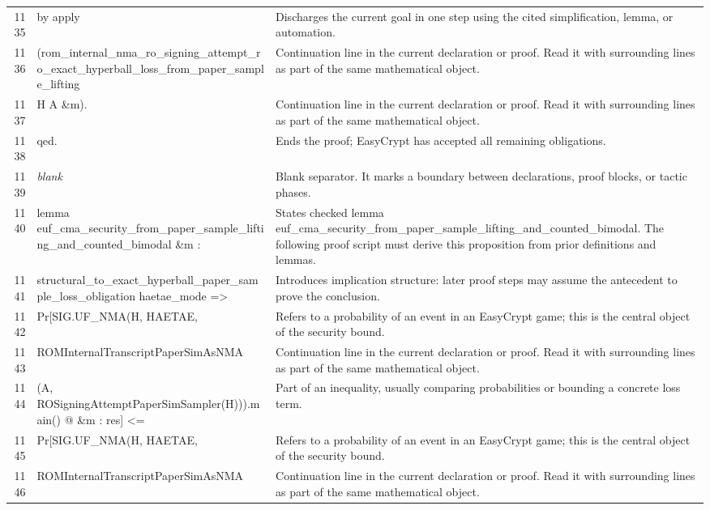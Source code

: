 \documentclass[10pt]{article}
\begin{document}
\begin{longtable}{r L{0.53\textwidth} L{0.37\textwidth}}
1135 & {\ttfamily\scriptsize by apply} & Discharges the current goal in one step using the cited simplification, lemma, or automation. \\
1136 & {\ttfamily\scriptsize   (rom\_internal\_nma\_ro\_signing\_attempt\_ro\_exact\_hyperball\_loss\_from\_paper\_sample\_lifting} & Continuation line in the current declaration or proof.  Read it with surrounding lines as part of the same mathematical object. \\
1137 & {\ttfamily\scriptsize      H A \&m).} & Continuation line in the current declaration or proof.  Read it with surrounding lines as part of the same mathematical object. \\
1138 & {\ttfamily\scriptsize qed.} & Ends the proof; EasyCrypt has accepted all remaining obligations. \\
1139 & {\ttfamily\scriptsize \emph{blank}} & Blank separator.  It marks a boundary between declarations, proof blocks, or tactic phases. \\
1140 & {\ttfamily\scriptsize lemma euf\_cma\_security\_from\_paper\_sample\_lifting\_and\_counted\_bimodal \&m :} & States checked lemma euf\_cma\_security\_from\_paper\_sample\_lifting\_and\_counted\_bimodal.  The following proof script must derive this proposition from prior definitions and lemmas. \\
1141 & {\ttfamily\scriptsize   structural\_to\_exact\_hyperball\_paper\_sample\_loss\_obligation haetae\_mode =>} & Introduces implication structure: later proof steps may assume the antecedent to prove the conclusion. \\
1142 & {\ttfamily\scriptsize   Pr[SIG.UF\_NMA(H, HAETAE,} & Refers to a probability of an event in an EasyCrypt game; this is the central object of the security bound. \\
1143 & {\ttfamily\scriptsize        ROMInternalTranscriptPaperSimAsNMA} & Continuation line in the current declaration or proof.  Read it with surrounding lines as part of the same mathematical object. \\
1144 & {\ttfamily\scriptsize          (A, ROSigningAttemptPaperSimSampler(H))).main() @ \&m : res] <=} & Part of an inequality, usually comparing probabilities or bounding a concrete loss term. \\
1145 & {\ttfamily\scriptsize   Pr[SIG.UF\_NMA(H, HAETAE,} & Refers to a probability of an event in an EasyCrypt game; this is the central object of the security bound. \\
1146 & {\ttfamily\scriptsize        ROMInternalTranscriptPaperSimAsNMA} & Continuation line in the current declaration or proof.  Read it with surrounding lines as part of the same mathematical object. \\

\end{longtable}
\end{document}
